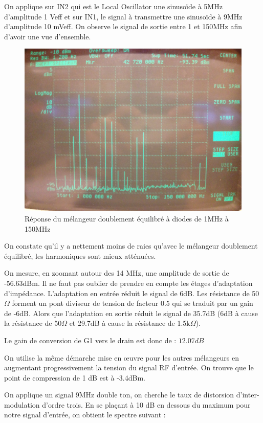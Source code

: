 \documentclass{article}
\begin{document}
On applique sur IN2 qui est le Local Oscillator une sinusoïde à 5MHz d'amplitude  1 Veff  et sur IN1, le signal à transmettre une sinusoïde à 9MHz d'amplitude 10 mVeff.
On observe le signal de sortie entre 1 et 150MHz afin d'avoir une vue d'ensemble.
\begin{figure}[h!]
	\centering
	\includegraphics[width=.7\textwidth]{10_3_1}
	\caption{Réponse du mélangeur doublement équilibré à diodes de 1MHz à 150MHz}
	\label{fig:10_3_1}
\end{figure}

On constate qu'il y a nettement moins de raies qu'avec le mélangeur doublement équilibré, les harmoniques sont mieux atténuées.


On mesure, en zoomant autour des 14 MHz, une amplitude de sortie de -56.63dBm.
Il ne faut pas oublier de prendre en compte les étages d'adaptation d'impédance. L'adaptation en entrée réduit le signal de 6dB. Les résistance de 50$\Omega$ forment un pont diviseur de tension de facteur 0.5 qui se traduit par un gain de -6dB.
Alors que l'adaptation en sortie réduit le signal de 35.7dB (6dB à cause la résistance de 50$\Omega$ et 29.7dB à cause la résistance de 1.5k$\Omega$).

Le gain de conversion de G1 vers le drain est donc de : $ 12.07 dB$


On utilise la même démarche mise en œuvre pour les autres mélangeurs en augmentant progressivement la tension du signal RF d'entrée.
On trouve que le point de compression de 1 dB est à -3.4dBm.


On applique un signal 9MHz double ton, on cherche le taux de distorsion d'inter-modulation d'ordre trois.
En se plaçant à 10 dB en dessous du maximum pour notre signal d'entrée, on obtient le spectre suivant :
\end{document}
